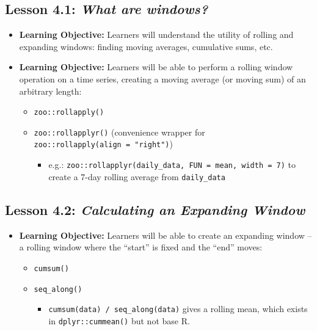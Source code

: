 \documentclass[
]{book}
\providecommand{\tightlist}{%
  \setlength{\itemsep}{0pt}\setlength{\parskip}{0pt}}
\begin{document}
\hypertarget{lesson-4.1-what-are-windows}{%
\subsection*{\texorpdfstring{Lesson 4.1: \emph{What are windows?}}{Lesson 4.1: What are windows?}}\label{lesson-4.1-what-are-windows}}

\begin{itemize}
\tightlist
\item
  \textbf{Learning Objective:} Learners will understand the utility of rolling and expanding windows: finding moving averages, cumulative sums, etc.
\item
  \textbf{Learning Objective:} Learners will be able to perform a rolling window operation on a time series, creating a moving average (or moving sum) of an arbitrary length:

  \begin{itemize}
  \tightlist
  \item
    \texttt{zoo::rollapply()}
  \item
    \texttt{zoo::rollapplyr()} (convenience wrapper for \texttt{zoo::rollapply(align\ =\ "right")})

    \begin{itemize}
    \tightlist
    \item
      e.g.: \texttt{zoo::rollapplyr(daily\_data,\ FUN\ =\ mean,\ width\ =\ 7)} to create a 7-day rolling average from \texttt{daily\_data}
    \end{itemize}
  \end{itemize}
\end{itemize}

\hypertarget{lesson-4.2-calculating-an-expanding-window}{%
\subsection*{\texorpdfstring{Lesson 4.2: \emph{Calculating an Expanding Window}}{Lesson 4.2: Calculating an Expanding Window}}\label{lesson-4.2-calculating-an-expanding-window}}

\begin{itemize}
\tightlist
\item
  \textbf{Learning Objective:} Learners will be able to create an expanding window -- a rolling window where the ``start'' is fixed and the ``end'' moves:

  \begin{itemize}
  \tightlist
  \item
    \texttt{cumsum()}
  \item
    \texttt{seq\_along()}

    \begin{itemize}
    \tightlist
    \item
      \texttt{cumsum(data)\ /\ seq\_along(data)} gives a rolling mean, which exists in \texttt{dplyr::cummean()} but not base R.
    \end{itemize}
  \end{itemize}
\end{itemize}
\end{document}
